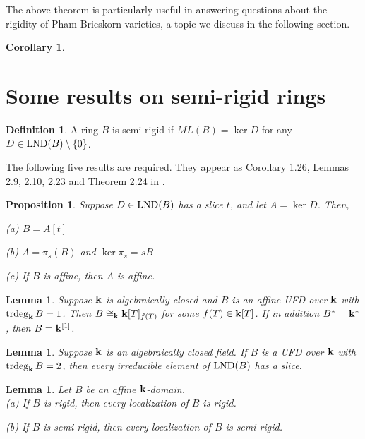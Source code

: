 \documentclass[12pt]{amsart}
\theoremstyle{plain}
\newtheorem{proposition}[subsection]{Proposition}
\newtheorem{lemma}[subsection]{Lemma}
\newtheorem{corollary}[subsection]{Corollary}
\theoremstyle{definition}
\newtheorem{definition}[subsection]{Definition}
\newcommand{\trdeg}{	\operatorname{{\rm trdeg}}}
\newcommand{\bk}{{\ensuremath{\rm \bf k}}}
\newcommand{\lnd}{\operatorname{{\rm LND}}}
\newcommand{\isom}{\cong}
\begin{document}
	The above theorem is particularly useful in answering questions about the rigidity of Pham-Brieskorn varieties, a topic we discuss in the following section. 
	
	\begin{corollary}
		
	\end{corollary}
	
	\section{Some results on semi-rigid rings}
	
	\begin{definition}
		A ring $B$ is semi-rigid if $ML(B) = \ker D$ for any $D \in \lnd(B) \setminus\{0\}$. 
	\end{definition}
	
	The following five results are required. They appear as Corollary 1.26, Lemmas 2.9, 2.10, 2.23 and Theorem 2.24 in \cite{freudenburg2017algebraic}.
	
	\begin{proposition}\label{sliceTheorem}
		Suppose $D \in \lnd(B)$ has a slice $t$, and let $A = \ker D$. Then,
		
		(a) $B = A[t]$
		
		(b) $A = \pi_s(B)$ and $\ker \pi_s = sB$
		
		(c) If $B$ is affine, then $A$ is affine. 
		
	\end{proposition}
	
	\begin{lemma} \label{FV2-2.9}
		Suppose $\bk$ is algebraically closed and $B$ is an affine UFD over $\bk$ with $\trdeg_\bk B = 1$. Then $B \isom_\bk \bk[T]_{f(T)}$ for some $f(T) \in \bk[T]$. If in addition $B^* = \bk^*$, then $B = \bk^{[1]}$. 
	\end{lemma}
	
	
	\begin{lemma}\label{FV2-2.10}
		Suppose $\bk$ is an algebraically closed field. If $B$ is a UFD over $\bk$ with $\trdeg_\bk B = 2$, then every irreducible element of $\lnd(B)$ has a slice. 
	\end{lemma}
	
	\begin{lemma} \label{rigidLocalization}
		Let $B$ be an affine $\bk$-domain. 
		\\
		
		(a) If $B$ is rigid, then every localization of $B$ is rigid. 
		
		(b) If $B$ is semi-rigid, then every localization of $B$ is semi-rigid. 
	\end{lemma}
	
\end{document}
